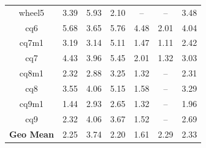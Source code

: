 \begin{table}[h]
{\begin{tabular}{c|ccccc|c}
            wheel5            & 3.39               & 5.93                 & 2.10                 & --                 & --                  & 3.48              \\
            cq6               & 5.68               & 3.65                 & 5.76                 & 4.48               & 2.01                & 4.04              \\
            cq7m1             & 3.19               & 3.14                 & 5.11                 & 1.47               & 1.11                & 2.42              \\
            cq7               & 4.43               & 3.96                 & 5.45                 & 2.01               & 1.32                & 3.03              \\
            cq8m1             & 2.32               & 2.88                 & 3.25                 & 1.32               & --                  & 2.31              \\
            cq8               & 3.55               & 4.06                 & 5.15                 & 1.58               & --                  & 3.29              \\
            cq9m1             & 1.44               & 2.93                 & 2.65                 & 1.32               & --                  & 1.96              \\
            cq9               & 2.32               & 4.06                 & 3.67                 & 1.52               & --                  & 2.69              \\
            \hline
            \textbf{Geo Mean} & 2.25               & 3.74                 & 2.20                 & 1.61               & 2.29                & 2.33
        \end{tabular}%
    }
    \label{tab:speedups}
\end{table}

